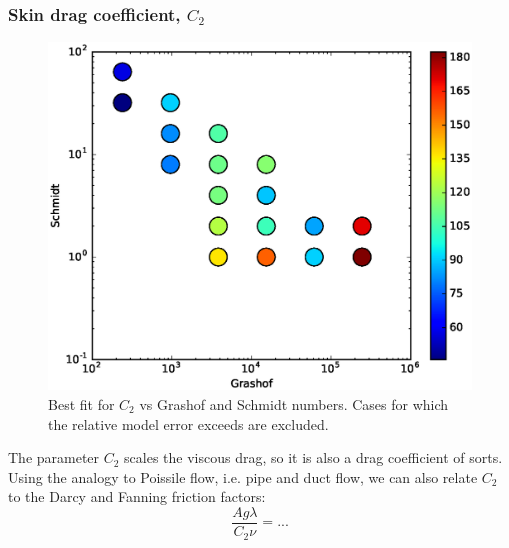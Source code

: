 \subsubsection{Skin drag coefficient, $C_2$}
\begin{figure}
\includegraphics[width=\columnwidth]{figs/C2-vs-Gr-Sc}
\caption{ 
  Best fit for $C_2$ vs Grashof and Schmidt numbers.
  Cases for which the relative model error exceeds \fittol are excluded.
}
\end{figure}


The parameter $C_2$ scales the viscous drag, so it is also a drag coefficient of sorts.
Using the analogy to Poissile flow, i.e. pipe and duct flow, we can also relate $C_2$ to the Darcy and Fanning friction factors:
\begin{equation}
\frac{A g \lambda}{C_2 \nu} = ...
\end{equation}

